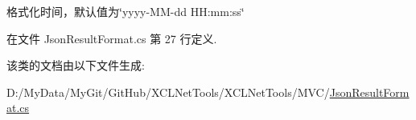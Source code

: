 格式化时间，默认值为\char`\"{}yyyy-\/\-M\-M-\/dd H\-H\-:mm\-:ss\char`\"{} 



在文件 Json\-Result\-Format.\-cs 第 27 行定义.



该类的文档由以下文件生成\-:\begin{DoxyCompactItemize}
\item 
D\-:/\-My\-Data/\-My\-Git/\-Git\-Hub/\-X\-C\-L\-Net\-Tools/\-X\-C\-L\-Net\-Tools/\-M\-V\-C/\hyperlink{_json_result_format_8cs}{Json\-Result\-Format.\-cs}\end{DoxyCompactItemize}
